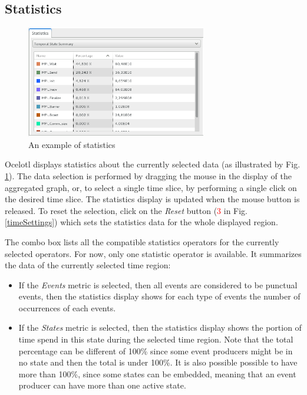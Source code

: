 \documentclass[twoside]{article}
\begin{document}
\begin{sloppypar}
\subsection{Statistics}
\begin{figure}[h!]
	\centering
	\includegraphics[width=0.7\textwidth]{images/statistics.png}
	\caption{An example of statistics}
	\label{stats}
\end{figure}
Ocelotl displays statistics about the currently selected data (as illustrated by Fig. \ref{stats}). The data selection is performed by dragging the mouse in the display of the aggregated graph, or, to select a single time slice, by performing a single click on the desired time slice. The statistics display is updated when the mouse button is released. To reset the selection, click on the \textit{Reset} button (\textcolor{red}{3} in Fig. \ref{timeSettings}) which sets the statistics data for the whole displayed region. 

The combo box lists all the compatible statistics operators for the currently selected operators. For now, only one statistic operator is available. It summarizes the data of the currently selected time region:
\begin{itemize} 
	\item If the \textit{Events} metric is selected, then all events are considered to be punctual events, then the statistics display shows for each type of events the number of occurrences of each events.
	\item If the \textit{States} metric is selected, then the statistics display shows the portion of time spend in this state during the selected time region. Note that the total percentage can be different of 100\% since some event producers might be in no state and then the total is under 100\%. It is also possible possible to have more than 100\%, since some states can be embedded, meaning that an event producer can have more than one active state.
\end{itemize}


\end{sloppypar}
\end{document}
